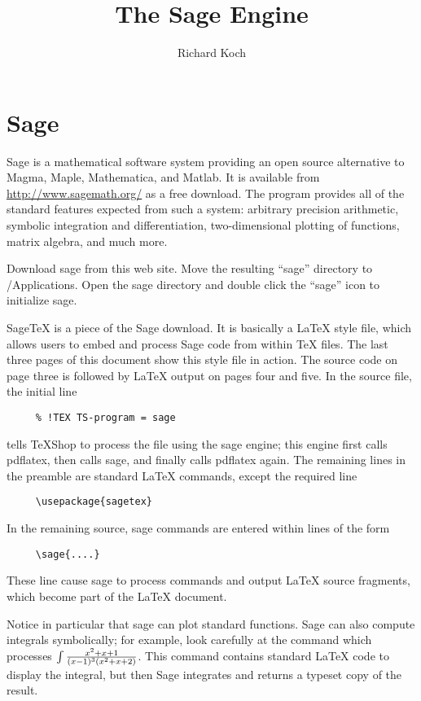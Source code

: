 \documentclass[11pt, oneside]{amsart}
\title{The Sage Engine}
\author{Richard Koch}
\begin{document}
\maketitle
\vspace{-.3in}
\section{Sage}
Sage is a mathematical software system providing an open source alternative to Magma, Maple, Mathematica, and Matlab. It is available from 
\url{http://www.sagemath.org/} as a free download. The program provides all of the standard features expected from such a system: arbitrary precision arithmetic, symbolic integration and differentiation, two-dimensional plotting of functions, matrix algebra, and much more.

Download sage from this web site. Move the resulting ``sage'' directory to /Applications. Open the sage directory and double click the ``sage'' icon to initialize sage.

SageTeX is a piece of the Sage download. It is basically a LaTeX style file, which  allows users to embed and process Sage code from within TeX files. The last three pages of this document show this style file in action. The source code on page three is followed by LaTeX output on pages four and five. In the source file, the initial line
\begin{verbatim}
     % !TEX TS-program = sage
\end{verbatim}
tells TeXShop to process the file using the sage engine; this engine first calls pdflatex, then calls sage, and finally calls pdflatex again.
The remaining lines in the preamble are standard LaTeX commands, except the required line
\begin{verbatim}
     \usepackage{sagetex}
\end{verbatim}
In the remaining source, sage commands are entered within lines of the form
\begin{verbatim}
     \sage{....}
\end{verbatim}
These line cause sage to process commands and output LaTeX source fragments, which become part of the LaTeX document.

Notice in particular that sage can plot standard functions. Sage can also compute integrals symbolically; for example, look carefully at the command which processes $\int {{x^2 + x + 1} \over {(x - 1)^3 (x^2 + x + 2)}}$. This command contains standard LaTeX code to display the integral, but then Sage integrates and returns a typeset copy of the result.
\end{document}

